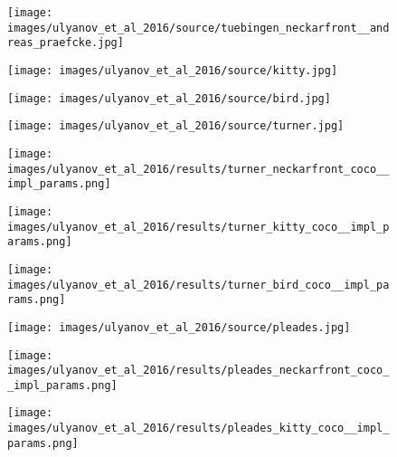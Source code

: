\begin{figure}[H]
	\begin{minipage}[t]{0.24\textwidth}
		\centering
		\hfill
	\end{minipage}
	\hfill%
	\begin{minipage}[t]{0.24\textwidth}
		\centering
		\texttt{[image: images/ulyanov\_et\_al\_2016/source/tuebingen\_neckarfront\_\_andreas\_praefcke.jpg]}
	\end{minipage}
	\hfill%
	\begin{minipage}[t]{0.24\textwidth}
		\centering
		\texttt{[image: images/ulyanov\_et\_al\_2016/source/kitty.jpg]}
	\end{minipage}
	\hfill%
	\begin{minipage}[t]{0.24\textwidth}
		\centering
		\texttt{[image: images/ulyanov\_et\_al\_2016/source/bird.jpg]}
	\end{minipage}
	\hfill%
	\begin{minipage}[t]{0.24\textwidth}
		\centering
		\texttt{[image: images/ulyanov\_et\_al\_2016/source/turner.jpg]}
	\end{minipage}
	\hfill%
	\begin{minipage}[t]{0.24\textwidth}
		\centering
		\texttt{[image: images/ulyanov\_et\_al\_2016/results/turner\_neckarfront\_coco\_\_impl\_params.png]}
	\end{minipage}
	\hfill%
	\begin{minipage}[t]{0.24\textwidth}
		\centering
		\texttt{[image: images/ulyanov\_et\_al\_2016/results/turner\_kitty\_coco\_\_impl\_params.png]}
	\end{minipage}
	\hfill%
	\begin{minipage}[t]{0.24\textwidth}
		\centering
		\texttt{[image: images/ulyanov\_et\_al\_2016/results/turner\_bird\_coco\_\_impl\_params.png]}
	\end{minipage}
	\hfill%
	\begin{minipage}[t]{0.24\textwidth}
		\centering
		\texttt{[image: images/ulyanov\_et\_al\_2016/source/pleades.jpg]}
	\end{minipage}
	\hfill%
	\begin{minipage}[t]{0.24\textwidth}
		\centering
		\texttt{[image: images/ulyanov\_et\_al\_2016/results/pleades\_neckarfront\_coco\_\_impl\_params.png]}
	\end{minipage}
	\hfill%
	\begin{minipage}[t]{0.24\textwidth}
		\centering
		\texttt{[image: images/ulyanov\_et\_al\_2016/results/pleades\_kitty\_coco\_\_impl\_params.png]}

\end{minipage}
\end{figure}
